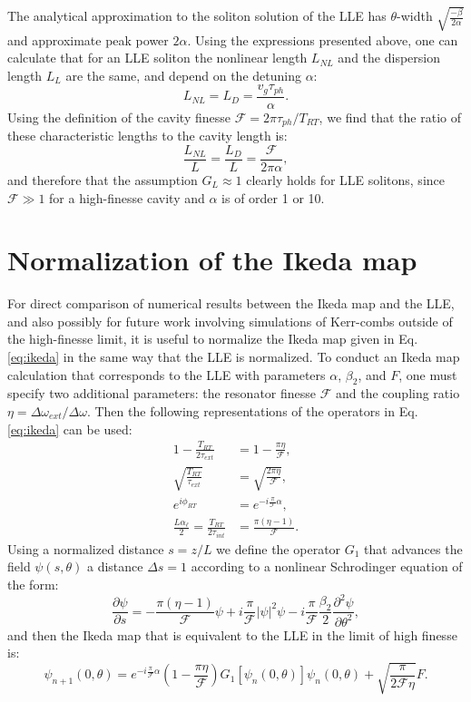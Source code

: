 The analytical approximation to the soliton solution of the LLE has $\theta$-width $\sqrt{\frac{-\beta}{2\alpha}}$ and approximate peak power $2\alpha$. Using the expressions presented above, one can calculate that for an LLE soliton the nonlinear length $L_{NL}$ and the dispersion length $L_L$ are the same, and depend on the detuning $\alpha$:
\begin{equation}
L_{NL}=L_D=\frac{v_g\tau_{ph}}{\alpha}.
\end{equation}
Using the definition of the cavity finesse $\mathcal{F}=2\pi\tau_{ph}/T_{RT}$, we find that the ratio of these characteristic lengths to the cavity length is:
\begin{equation}
\frac{L_{NL}}{L}=\frac{L_D}{L}=\frac{\mathcal{F}}{2\pi\alpha},
\end{equation}
and therefore that the assumption $G_L\approx 1$ clearly holds for LLE solitons, since $\mathcal{F}\gg1$ for a high-finesse cavity and $\alpha$ is of order 1 or 10.

\section{Normalization of the Ikeda map}

For direct comparison of numerical results between the Ikeda map and the LLE, and also possibly for future work involving simulations of Kerr-combs outside of the high-finesse limit, it is useful to normalize the Ikeda map given in Eq. \ref{eq:ikeda} in the same way that the LLE is normalized. To conduct an Ikeda map calculation that corresponds to the LLE with parameters $\alpha$, $\beta_2$, and $F$, one must specify two additional parameters: the resonator finesse $\mathcal{F}$ and the coupling ratio $\eta=\Delta\omega_{ext}/\Delta\omega$. Then the following representations of the operators in Eq. \ref{eq:ikeda} can be used:
\begin{align}
1-\frac{T_{RT}}{2\tau_{ext}}&=1-\frac{\pi\eta}{\mathcal{F}},\\
\sqrt{\frac{T_{RT}}{\tau_{ext}}}&=\sqrt{\frac{2\pi\eta}{\mathcal{F}}},\\
e^{i\phi_{RT}}&=e^{-i\frac{\pi}{\mathcal{F}}\alpha},\\
\frac{L\alpha_\ell}{2}=\frac{T_{RT}}{2\tau_{int}}&=\frac{\pi(\eta-1)}{\mathcal{F}}.
\end{align}
Using a normalized distance $s=z/L$ we define the operator $G_1$ that advances the field $\psi(s,\theta)$ a distance $\Delta s=1$ according to a nonlinear Schrodinger equation of the form:
\begin{equation}
\frac{\partial \psi}{\partial s}= -\frac{\pi(\eta-1)}{\mathcal{F}} \psi+i\frac{\pi}{\mathcal{F}}|\psi|^2 \psi -i \frac{\pi}{\mathcal{F}} \frac{\beta_2}{2} \frac{\partial^2 \psi}{\partial \theta^2},
\end{equation}
and then the Ikeda map that is equivalent to the LLE in the limit of high finesse is:
\begin{equation}
\psi_{n+1}(0,\theta)=e^{-i\frac{\pi}{\mathcal{F}}\alpha}\left(1-\frac{\pi\eta}{\mathcal{F}}\right)G_1\left[\psi_n(0,\theta)\right]\psi_n(0,\theta)+\sqrt{\frac{\pi}{2\mathcal{F}\eta}}F.
\end{equation}


